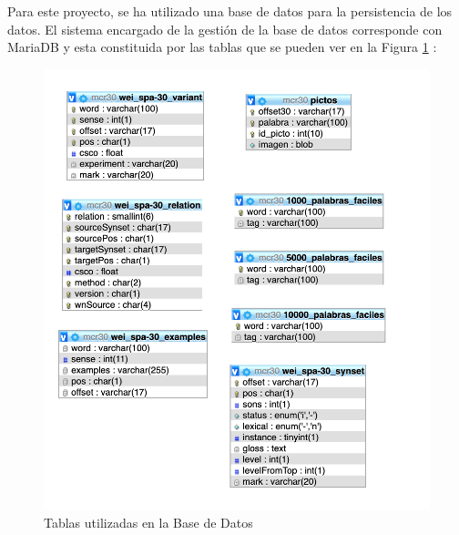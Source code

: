 Para este proyecto, se ha utilizado una base de datos para la persistencia de los datos. El sistema encargado de la gestión de la base de datos corresponde con MariaDB y esta constituida por las tablas que se pueden ver en la Figura \ref{fig:tablasBBDD} :

\begin{figure}[!h]
	\includegraphics[width=.8\textwidth]{Imagenes/Bitmap/Capitulo4/tablasBBDD.png}
	\centering
	\caption{Tablas utilizadas en la Base de Datos}
	\label{fig:tablasBBDD}
\end{figure}

